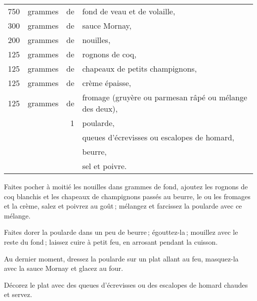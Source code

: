 \footnotesize
\begin{longtable}{rrrp{16em}}
    750 & grammes & de & fond de veau et de volaille,                                                     \\
    300 & grammes & de & sauce Mornay,                                                                    \\
    200 & grammes & de & nouilles,                                                                        \\
    125 & grammes & de & rognons de coq,                                                                  \\
    125 & grammes & de & chapeaux de petits champignons,                                                  \\
    125 & grammes & de & crème épaisse,                                                                   \\
    125 & grammes & de & fromage (gruyère ou parmesan râpé ou mélange des deux),                          \\
        &         &  1 & poularde,                                                                        \\
        &         &    & queues d'écrevisses ou escalopes de homard,                                      \\
        &         &    & beurre,                                                                          \\
        &         &    & sel et poivre.                                                                   \\
\end{longtable}
\normalsize


Faites pocher à moitié les nouilles dans {\mmm} grammes de fond, ajoutez les
rognons de coq blanchis et les chapeaux de champignons passés au beurre, le ou
les fromages et la crème, salez et poivrez au goût ; mélangez et farcissez la
poularde avec ce mélange.

Faites dorer la poularde dans un peu de beurre ; égouttez-la ; mouillez avec le
reste du fond ; laissez cuire à petit feu, en arrosant pendant la cuisson.

Au dernier moment, dressez la poularde sur un plat allant au feu, masquez-la
avec la sauce Mornay et glacez au four.

Décorez le plat avec des queues d'écrevisses ou des escalopes de homard chaudes
et servez.

